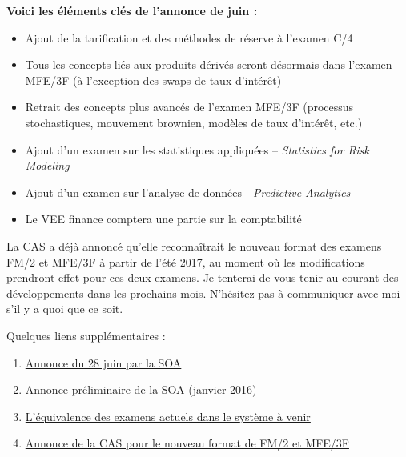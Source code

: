 \textbf{Voici les éléments clés de l’annonce de juin :}
\begin{itemize}
\item Ajout de la tarification et des méthodes de réserve à l’examen C/4
\item Tous les concepts liés aux produits dérivés seront désormais dans l'examen MFE/3F (à l'exception des swaps de taux d'intérêt)
\item Retrait des concepts plus avancés de l’examen MFE/3F (processus stochastiques, mouvement brownien, modèles de taux d’intérêt, etc.)
\item Ajout d’un examen sur les statistiques appliquées – \emph{Statistics for Risk Modeling}  
\item Ajout d’un examen sur l’analyse de données - \emph{Predictive Analytics}
\item Le VEE finance comptera une partie sur la comptabilité 
\end{itemize}
\vspace{\baselineskip} 

La CAS a déjà annoncé qu’elle reconnaîtrait le nouveau format des examens FM/2 et MFE/3F à partir de l’été 2017, au moment où les modifications prendront effet pour ces deux examens. Je tenterai de vous tenir au courant des développements dans les prochains mois. N’hésitez pas à communiquer avec moi s’il y a quoi que ce soit.\vspace{\baselineskip} 

Quelques liens supplémentaires :
\begin{enumerate}
\item \href{https://www.soa.org/Education/General-Info/2016-asa-cera-curriculum-changes.aspx}{Annonce du 28 juin par la SOA}
\item \href{https://soa.qualtrics.com/CP/File.php?F=F_0TDd9bj143TrCW9}{Annonce préliminaire de la SOA (janvier 2016)}
\item \href{https://www.soa.org/Education/General-Info/2016-transition-rules-asa-candidated.aspx}{L’équivalence des examens actuels dans le système à venir}
\item \href{http://www.casact.org/press/index.cfm?fa=viewArticle&articleID=3273}{Annonce de la CAS pour le nouveau format de FM/2 et MFE/3F}
\end{enumerate}

